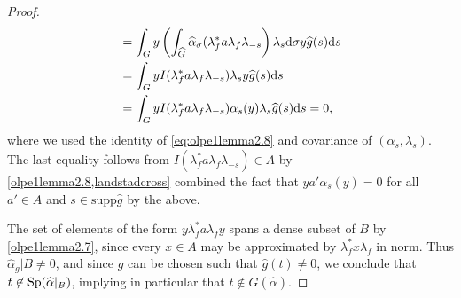 \begin{proof}
\begin{align*}
		&= \int_{G} y \left( \int_{\widehat{G}} \widehat{\alpha}_{\sigma}(\lambda_f^* a \lambda_f \lambda_{-s}\right) \lambda_s \mathrm{d} \sigma y \widehat{g}(s) \mathrm{d} s\\
		&= \int_G y I(\lambda_f^* a \lambda_f \lambda_{-s}) \lambda_s y \widehat{g}(s) \mathrm{d} s\\
		&= \int_G y I(\lambda_f^* a \lambda_f \lambda_{-s}) \alpha_s(y) \lambda_s \widehat{g}(s)\mathrm{d} s = 0,
	\end{align*}
	where we used the identity of \cref{eq:olpe1lemma2.8} and covariance of $(\alpha_s,\lambda_s)$. The last equality follows from $I(\lambda_f^* a \lambda_f \lambda_{-s}) \in A$ by \cref{olpe1lemma2.8,landstadcross} combined the fact that $y a' \alpha_s(y)= 0 $ for all $a' \in A$ and $s \in \mathrm{supp} \hat g$ by the above. 
	
	The set of elements of the form $y \lambda_f^* a \lambda_f y$ spans a dense subset of $B$ by \cref{olpe1lemma2.7}, since every $x \in A$ may be approximated by $\lambda_f^* x \lambda_f$ in norm. Thus $\hat \alpha_g | B \neq 0$, and since $g$ can be chosen such that $\hat g (t) \neq 0$, we conclude that $t \not \in \mathrm{Sp}(\widehat{\alpha}|_B)$, implying in particular that  $ t \not \in G(\hat \alpha)$.


\end{proof}
